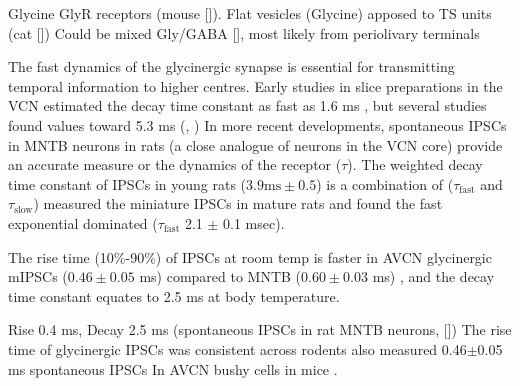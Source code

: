Glycine GlyR receptors (mouse []).
Flat vesicles (Glycine) apposed to TS units (cat [])
Could be mixed Gly/GABA [], most likely from periolivary terminals

The fast dynamics of the glycinergic synapse is essential for transmitting
temporal information to higher centres.  Early studies in slice preparations in
the VCN estimated the decay time constant as fast as 1.6 ms
, but several studies found values toward 5.3 ms
(\citep*[mouse][]{OertelWickesberg:1993,WickesbergOertel:1993}, \citep*[guinea~pig VCN][]{HartyManis:1998}) In more recent developments, spontaneous IPSCs in
MNTB neurons in rats (a close analogue of neurons in the VCN core) provide an
accurate measure or the dynamics of the receptor ($\tau$). The weighted decay
time constant of IPSCs in young rats ($3.9 \mathrm{ms} \pm 0.5$) is a
combination of ($\tau_{\textrm{fast}}$ and $\tau_{\textrm{slow}}$)
\citet{AwatramaniTurecekEtAl:2004} measured the miniature IPSCs in mature rats
and found the fast exponential dominated ($\tau_{\textrm{fast}}$ 2.1 $\pm$ 0.1
msec).  




The rise time (10\%-90\%) of IPSCs at room temp is faster in AVCN glycinergic mIPSCs
($0.46\pm0.05$ ms) compared to MNTB ($0.60\pm0.03$ ms) \citep{LimOleskevichEtAl:2003}, and the decay time constant equates to 2.5 ms at body temperature.

Rise 0.4 ms, Decay 2.5 ms (spontaneous IPSCs in rat MNTB neurons, []) 
The rise time of glycinergic IPSCs was consistent across rodents also measured 0.46$\pm$0.05 ms spontaneous IPSCs In
AVCN bushy cells in mice \citep{LimOleskevichEtAl:2003}.



